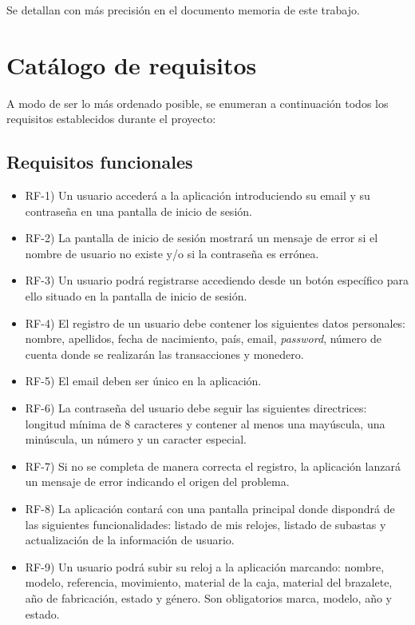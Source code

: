 	Se detallan con más precisión en el documento memoria de este trabajo.

\section{Catálogo de requisitos}

	A modo de ser lo más ordenado posible, se enumeran a continuación todos los requisitos establecidos durante el proyecto:
	
\subsection{Requisitos funcionales}
	
\begin{itemize}
	\item RF-1) Un usuario accederá a la aplicación introduciendo su email y su contraseña en una pantalla de inicio de sesión.
	\item RF-2) La pantalla de inicio de sesión mostrará un mensaje de error si el nombre de usuario no existe y/o si la contraseña es errónea.
	\item RF-3) Un usuario podrá registrarse accediendo desde un botón específico para ello situado en la pantalla de inicio de sesión.	
	\item RF-4) El registro de un usuario debe contener los siguientes datos personales: nombre, apellidos, fecha de nacimiento, país, email, \emph{password}, número de cuenta donde se realizarán las transacciones y monedero.
	\item RF-5) El email deben ser único en la aplicación.
	\item RF-6) La contraseña del usuario debe seguir las siguientes directrices: longitud mínima de 8 caracteres y contener al menos una mayúscula, una minúscula, un número y un caracter especial.
	\item RF-7) Si no se completa de manera correcta el registro, la aplicación lanzará un mensaje de error indicando el origen del problema.
	\item RF-8) La aplicación contará con una pantalla principal donde dispondrá de las siguientes funcionalidades: listado de mis relojes, listado de subastas y actualización de la información de usuario.
	\item RF-9) Un usuario podrá subir su reloj a la aplicación marcando: nombre, modelo, referencia, movimiento, material de la caja, material del brazalete, año de fabricación, estado y género. Son obligatorios marca, modelo, año y estado.

\end{itemize}
